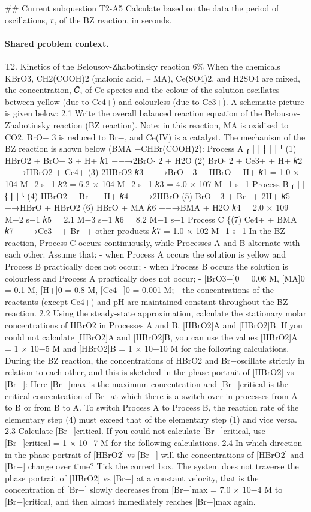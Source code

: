 \#\# Current subquestion T2-A5
Calculate based on the data the period of oscillations, 𝜏, of the BZ reaction, in seconds.

\paragraph{Shared problem context.}
T2. Kinetics of the Belousov-Zhabotinsky reaction 6\% When the chemicals KBrO3, CH2(COOH)2 (malonic acid, – MA), Ce(SO4)2, and H2SO4 are mixed, the concentration, 𝐶, of Ce species and the colour of the solution oscillates between yellow (due to Ce4+) and colourless (due to Ce3+). A schematic picture is given below: 2.1 Write the overall balanced reaction equation of the Belousov-Zhabotinsky reaction (BZ reaction). Note: in this reaction, MA is oxidised to CO2, BrO− 3 is reduced to Br−, and Ce(IV) is a catalyst. The mechanism of the BZ reaction is shown below (BMA −CHBr(COOH)2): Process A ⎧ ⎪ ⎪ ⎨ ⎪ ⎪ ⎩ (1) HBrO2 + BrO− 3 + H+ 𝑘1 −−→2BrO⋅ 2 + H2O (2) BrO⋅ 2 + Ce3+ + H+ 𝑘2 −−→HBrO2 + Ce4+ (3) 2HBrO2 𝑘3 −−→BrO− 3 + HBrO + H+ 𝑘1 = 1.0 × 104 M−2 s−1 𝑘2 = 6.2 × 104 M−2 s−1 𝑘3 = 4.0 × 107 M−1 s−1 Process B ⎧ ⎪ ⎪ ⎨ ⎪ ⎪ ⎩ (4) HBrO2 + Br−+ H+ 𝑘4 −−→2HBrO (5) BrO− 3 + Br−+ 2H+ 𝑘5 −−→HBrO + HBrO2 (6) HBrO + MA 𝑘6 −−→BMA + H2O 𝑘4 = 2.0 × 109 M−2 s−1 𝑘5 = 2.1 M−3 s−1 𝑘6 = 8.2 M−1 s−1 Process C \{(7) Ce4+ + BMA 𝑘7 −−→Ce3+ + Br−+ other products 𝑘7 = 1.0 × 102 M−1 s−1 In the BZ reaction, Process C occurs continuously, while Processes A and B alternate with each other. Assume that: - when Process A occurs the solution is yellow and Process B practically does not occur; - when Process B occurs the solution is colourless and Process A practically does not occur; - [BrO3−]0 = 0.06 M, [MA]0 = 0.1 M, [H+]0 = 0.8 M, [Ce4+]0 = 0.001 M; - the concentrations of the reactants (except Ce4+) and pH are maintained constant throughout the BZ reaction. 2.2 Using the steady-state approximation, calculate the stationary molar concentrations of HBrO2 in Processes A and B, [HBrO2]A and [HBrO2]B. If you could not calculate [HBrO2]A and [HBrO2]B, you can use the values [HBrO2]A = 1 × 10−5 M and [HBrO2]B = 1 × 10−10 M for the following calculations. During the BZ reaction, the concentrations of HBrO2 and Br−oscillate strictly in relation to each other, and this is sketched in the phase portrait of [HBrO2] vs [Br−]: Here [Br−]max is the maximum concentration and [Br−]critical is the critical concentration of Br−at which there is a switch over in processes from A to B or from B to A. To switch Process A to Process B, the reaction rate of the elementary step (4) must exceed that of the elementary step (1) and vice versa. 2.3 Calculate [Br−]critical. If you could not calculate [Br−]critical, use [Br−]critical = 1 × 10−7 M for the following calculations. 2.4 In which direction in the phase portrait of [HBrO2] vs [Br−] will the concentrations of [HBrO2] and [Br−] change over time? Tick the correct box. The system does not traverse the phase portrait of [HBrO2] vs [Br−] at a constant velocity, that is the concentration of [Br−] slowly decreases from [Br−]max = 7.0 × 10−4 M to [Br−]critical, and then almost immediately reaches [Br−]max again.

